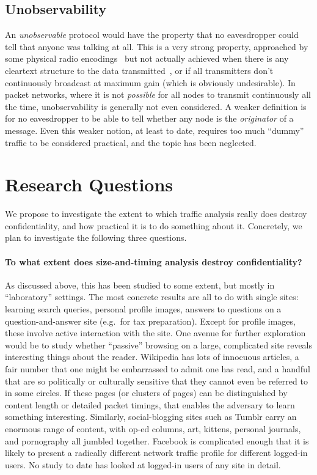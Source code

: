 \documentclass[oneside]{zarticle}
\begin{document}
\subsection{Unobservability}

An \emph{unobservable} protocol would have the property that no
eavesdropper could tell that anyone was talking at all.  This is a
very strong property, approached by some physical radio
encodings~\cite{pickholtz1982theory, yu2007dsss} but not actually
achieved when there is any cleartext structure to the data
transmitted~\cite{jia2013blind}, or if all transmitters don't
continuously broadcast at maximum gain (which is obviously
undesirable).  In packet networks, where it is not \emph{possible} for
all nodes to transmit continuously all the time, unobservability is
generally not even considered.  A weaker definition is for no
eavesdropper to be able to tell whether any node is the
\emph{originator} of a message.  Even this weaker notion, at least to
date, requires too much “dummy” traffic to be considered practical,
and the topic has been neglected.

\section{Research Questions}

We propose to investigate the extent to which traffic analysis really
does destroy confidentiality, and how practical it is to do something
about it.  Concretely, we plan to investigate the following three
questions.

\paragraph{To what extent does size-and-timing analysis destroy
  confidentiality?}  As discussed above, this has been studied to some
extent, but mostly in “laboratory” settings.  The most concrete
results are all to do with single sites: learning search queries, personal
profile images, answers to questions on a question-and-answer site
(e.g.\ for tax preparation).  Except for profile images, these involve
active interaction with the site.  One avenue for further exploration
would be to study whether “passive” browsing on a large, complicated
site reveals interesting things about the reader.  Wikipedia has lots of
innocuous articles, a fair number that one might be embarrassed to
admit one has read, and a handful that are so politically or
culturally sensitive that they cannot even be referred to in some
circles.  If these pages (or clusters of pages) can be distinguished
by content length or detailed packet timings, that enables the
adversary to learn something interesting.  Similarly, social-blogging
sites such as Tumblr carry an enormous range of content, with op-ed
columns, art, kittens, personal journals, and pornography all jumbled
together.  Facebook is complicated enough that it is likely to present
a radically different network traffic profile for different logged-in
users. No study to date has looked at logged-in users of any site in
detail.
\end{document}
